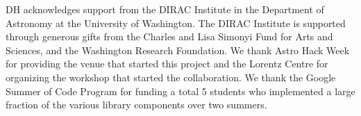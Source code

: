 \documentclass[twocolumn]{aastex62}
\begin{document}
\acknowledgments
DH acknowledges support from the DIRAC Institute in the Department of Astronomy at the University of Washington. The DIRAC Institute is supported through generous gifts from the Charles and Lisa Simonyi Fund for Arts and Sciences, and the Washington Research Foundation.
We thank Astro Hack Week for providing the venue that started this project and the Lorentz Centre for organizing the workshop that started the collaboration. We thank the Google Summer of Code Program for funding a total 5 students who implemented a large fraction of the various library components over two summers.

%





\end{document}
